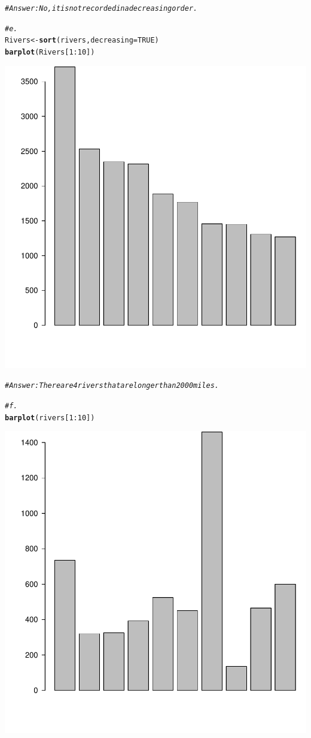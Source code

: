 \documentclass{article}\usepackage[]{graphicx}\usepackage[]{xcolor}
\makeatletter
\newcommand{\hlnum}[1]{\textcolor[rgb]{0.686,0.059,0.569}{#1}}%
\newcommand{\hlcom}[1]{\textcolor[rgb]{0.678,0.584,0.686}{\textit{#1}}}%
\newcommand{\hlopt}[1]{\textcolor[rgb]{0,0,0}{#1}}%
\newcommand{\hlstd}[1]{\textcolor[rgb]{0.345,0.345,0.345}{#1}}%
\newcommand{\hlkwb}[1]{\textcolor[rgb]{0.69,0.353,0.396}{#1}}%
\newcommand{\hlkwc}[1]{\textcolor[rgb]{0.333,0.667,0.333}{#1}}%
\newcommand{\hlkwd}[1]{\textcolor[rgb]{0.737,0.353,0.396}{\textbf{#1}}}%
\newenvironment{kframe}{%
 \def\at@end@of@kframe{}%
 \ifinner\ifhmode%
  \def\at@end@of@kframe{\end{minipage}}%
  \begin{minipage}{\columnwidth}%
 \fi\fi%
 \def\FrameCommand##1{\hskip\@totalleftmargin \hskip-\fboxsep
 \colorbox{shadecolor}{##1}\hskip-\fboxsep
     \hskip-\linewidth \hskip-\@totalleftmargin \hskip\columnwidth}%
 \MakeFramed {\advance\hsize-\width
   \@totalleftmargin\z@ \linewidth\hsize
   \@setminipage}}%
 {\par\unskip\endMakeFramed%
 \at@end@of@kframe}
\newenvironment{knitrout}{}{} %
\makeatother
\begin{document}
\begin{knitrout}
\begin{kframe}\begin{alltt}
\hlcom{#Answer: No, it is not recorded in a decreasing order.}

\hlcom{#e.}
\hlstd{Rivers} \hlkwb{<-} \hlkwd{sort}\hlstd{(rivers,} \hlkwc{decreasing} \hlstd{=} \hlnum{TRUE}\hlstd{)}
\hlkwd{barplot}\hlstd{(Rivers[}\hlnum{1}\hlopt{:}\hlnum{10}\hlstd{])}
\end{alltt}
\end{kframe}

{\centering \includegraphics[width=.6\linewidth]{figure/Meng51940633A1-Rnwauto-report-2} 

}


\begin{kframe}\begin{alltt}
\hlcom{#Answer: There are 4 rivers that are longer than 2000 miles.}

\hlcom{#f.}
\hlkwd{barplot}\hlstd{(rivers[}\hlnum{1}\hlopt{:}\hlnum{10}\hlstd{])}
\end{alltt}
\end{kframe}

{\centering \includegraphics[width=.6\linewidth]{figure/Meng51940633A1-Rnwauto-report-3} 

}
\end{knitrout}
\end{document}
